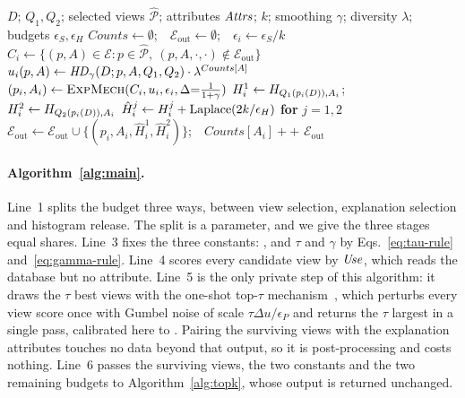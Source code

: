 \begin{algorithm}[t]
\caption{Find-Top-$k$-Explanations}
\label{alg:topk}
\begin{algorithmic}[1]
\Require $D$; $Q_1,Q_2$; selected views $\widehat{\mathcal{P}}$; attributes $\mathit{Attrs}$; $k$; smoothing $\gamma$; diversity $\lambda$; budgets $\epsilon_S,\epsilon_H$
\State $Counts\gets\emptyset$;\ \ $\mathcal{E}_{\mathrm{out}}\gets\emptyset$;\ \ $\epsilon_i \gets \epsilon_S/k$
  \State $C_i \gets \{(p,A)\in\mathcal{E}: p\in\widehat{\mathcal{P}},\ (p,A,\cdot,\cdot)\notin\mathcal{E}_{\mathrm{out}}\}$
  \State $u_i(p,A)\gets \mathit{HD}_{\gamma}(D;p,A,Q_1,Q_2)\cdot \lambda^{Counts[A]}$
  \State $(p_i,A_i)\gets \textsc{ExpMech}(C_i,u_i,\epsilon_i,\Delta{=}\tfrac{1}{1+\gamma})$
  \State $H^1_i\gets H_{Q_1(p_i(D)),A_i}$;\ \ $H^2_i\gets H_{Q_2(p_i(D)),A_i}$
  \State $\hat H^j_i\gets H^j_i+\operatorname{Laplace}(2k/\epsilon_H)$ \textbf{for} $j=1,2$
  \State $\mathcal{E}_{\mathrm{out}}\gets\mathcal{E}_{\mathrm{out}}\cup\{(p_i,A_i,\hat H^1_i,\hat H^2_i)\}$;\ \ $Counts[A_i]{+}{+}$
\EndFor
\State \Return $\mathcal{E}_{\mathrm{out}}$
\end{algorithmic}
\end{algorithm}

\paragraph{Algorithm~\ref{alg:main}.}
Line~1 splits the budget three ways, between view selection, explanation selection and histogram release.
The split is a parameter, and we give the three stages equal shares.
Line~3 fixes the three constants: , and $\tau$ and $\gamma$ by Eqs.~\eqref{eq:tau-rule} and~\eqref{eq:gamma-rule}. 
Line~4 scores every candidate view by $\mathit{Use}$, which reads the database but no attribute.
Line~5 is the only private step of this algorithm: it draws the $\tau$ best views with the one-shot top-$\tau$ mechanism~\cite{DurfeeRogers19}, which perturbs every view score once with Gumbel noise of scale $\tau\Delta u/\epsilon_P$ and returns the $\tau$ largest in a single pass, calibrated here to .
Pairing the surviving views with the explanation attributes touches no data beyond that output, so it is post-processing and costs nothing.
Line~6 passes the surviving views, the two constants and the two remaining budgets to Algorithm~\ref{alg:topk}, whose output is returned unchanged.

